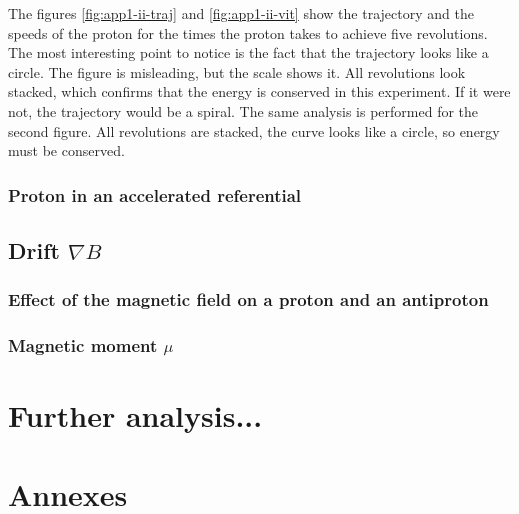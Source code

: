 \documentclass[a4paper,12pt,twoside]{article}
\begin{document}
The figures \ref{fig:app1-ii-traj} and \ref{fig:app1-ii-vit} show the trajectory and the speeds of the proton for the times the proton takes to achieve five revolutions.
The most interesting point to notice is the fact that the trajectory looks like a circle.
The figure is misleading, but the scale shows it.
All revolutions look stacked, which confirms that the energy is conserved in this experiment.
If it were not, the trajectory would be a spiral.
The same analysis is performed for the second figure.
All revolutions are stacked, the curve looks like a circle, so energy must be conserved.\\


\subsubsection{Proton in an accelerated referential}

\subsection{Drift $\nabla B$}

\subsubsection{Effect of the magnetic field on a proton and an antiproton}

\subsubsection{Magnetic moment $\mu$}

\section{Further analysis...}

\appendix
\section*{Annexes}
\end{document}
